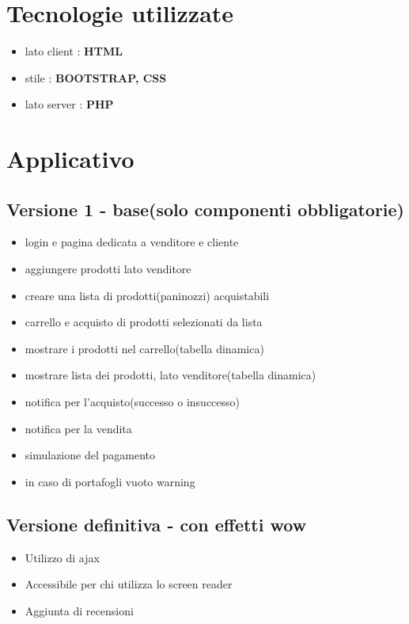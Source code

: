 \documentclass[a4paper,12pt]{report}
\begin{document}
	\section{Tecnologie utilizzate}
	\begin{itemize}
		\item lato client : \textbf{HTML}
		\item stile : \textbf{BOOTSTRAP, CSS}
		\item lato server : \textbf{PHP}
	\end{itemize}

	\section{Applicativo}
	
	\subsection{Versione 1 - base(solo componenti obbligatorie)}
	\begin{itemize}
		\item login e pagina dedicata a venditore e cliente
		\item aggiungere prodotti lato venditore
		\item creare una lista di prodotti(paninozzi) acquistabili
		\item carrello e acquisto di prodotti selezionati da lista
		\item mostrare i prodotti nel carrello(tabella dinamica)
		\item mostrare lista dei prodotti, lato venditore(tabella dinamica)
		\item notifica per l'acquisto(successo o insuccesso)
		\item notifica per la vendita
		\item simulazione del pagamento
		\item in caso di portafogli vuoto warning
	\end{itemize}

	\subsection{Versione definitiva - con effetti wow}
	\begin{itemize}
		\item Utilizzo di ajax
		\item Accessibile per chi utilizza lo screen reader
		\item Aggiunta di recensioni 
	\end{itemize}
\end{document}
